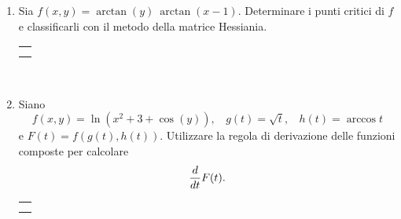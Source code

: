 \documentclass[12pt,a4paper]{report}\pagenumbering{roman}
\begin{document}
\begin{enumerate}
\item Sia $f(x,y)=\arctan(y)\ \arctan(x-1)$. Determinare i punti critici di 
$f$ e classificarli con il metodo della matrice Hessiania.

\hspace*{-3.5cm}\begin{tabular}{c}\hline\\\hspace*{15.7cm}\end{tabular}\\
\hspace*{-3.5cm}{\textbf SVOLGIMENTO:}\pagebreak

\item Siano
$$f(x,y)=\ln(x^2+3+\cos(y)),\ \ \ \ g(t)=\sqrt{t},\ \ \ \ h(t)=\arccos t$$
e $F(t)=f(g(t),h(t))$. Utilizzare la regola di derivazione delle funzioni
composte per calcolare 
$${d\over dt}F(t).$$
\hspace*{-3.5cm}\begin{tabular}{c}\hline\\\hspace*{15.7cm}\end{tabular}\\
\hspace*{-3.5cm}{\textbf SVOLGIMENTO:}

\end{enumerate}
\end{document}
